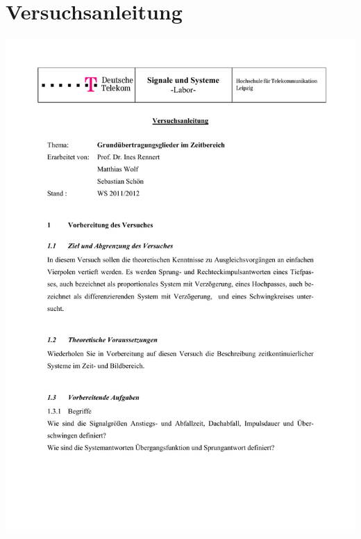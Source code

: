 \section*{Versuchsanleitung}

\includegraphics[width=1.0\textwidth]{Bilder/Grundubertragungsglieder im Zeitbereich (verschoben)}\newpage
